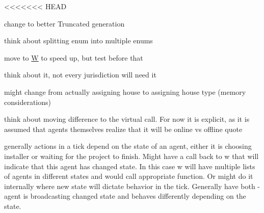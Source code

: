 
\begin{DoxyRefList}
<<<<<<< HEAD
\item[\label{_dev_stage2__DevStage2000027}%
\hypertarget{_dev_stage2__DevStage2000027}{}%
Member \hyperlink{namespaceserialize_aa5ee0bad0c960a3f06430066217d8c12}{serialize\+:\+:solve\+\_\+str\+\_\+formula} (const std\+::string \&formula\+\_\+, I\+Random \&rand\+\_\+)]change to better Truncated generation  
\item[\label{_dev_stage2__DevStage2000026}%
\hypertarget{_dev_stage2__DevStage2000026}{}%
Member \hyperlink{namespacesolar__core_aa1147341e5ef7a40d68d1bd68e149362}{solar\+\_\+core\+:\+:E\+Param\+Types} ]think about splitting enum into multiple enums 
\item[\label{_dev_stage2__DevStage2000001}%
\hypertarget{_dev_stage2__DevStage2000001}{}%
Member \hyperlink{classsolar__core_1_1_g_a624adac31ade604e0335717bad4fc9cd}{solar\+\_\+core\+:\+:G\+:\+:G} (const Property\+Tree \&pt\+\_\+, \hyperlink{classsolar__core_1_1_w}{W} $\ast$w\+\_\+)]move to \hyperlink{classsolar__core_1_1_w}{W} to speed up, but test before that  
\item[\label{_dev_stage2__DevStage2000002}%
\hypertarget{_dev_stage2__DevStage2000002}{}%
Member \hyperlink{classsolar__core_1_1_g_a33472d3b331a303ec8a9b61e2da163d3}{solar\+\_\+core\+:\+:G\+:\+:schedule\+\_\+visits} ]think about it, not every jurisdiction will need it  
\item[\label{_dev_stage2__DevStage2000008}%
\hypertarget{_dev_stage2__DevStage2000008}{}%
Class \hyperlink{classsolar__core_1_1_household}{solar\+\_\+core\+:\+:Household} ]might change from actually assigning house to assigning house type (memory considerations) 
\item[\label{_dev_stage2__DevStage2000005}%
\hypertarget{_dev_stage2__DevStage2000005}{}%
Member \hyperlink{classsolar__core_1_1_household_a165b7c64c72e5ed4ea08307e32082517}{solar\+\_\+core\+:\+:Household\+:\+:ac\+\_\+inf\+\_\+quoting\+\_\+sei} ()]think about moving difference to the virtual call. For now it is explicit, as it is assumed that agents themselves realize that it will be online vs offline quote  
\item[\label{_dev_stage2__DevStage2000007}%
\hypertarget{_dev_stage2__DevStage2000007}{}%
Member \hyperlink{classsolar__core_1_1_household_a1e7d20a60dc42b8d09a8d23a4cdb26a6}{solar\+\_\+core\+:\+:Household\+:\+:act\+\_\+tick} ()]generally actions in a tick depend on the state of an agent, either it is choosing installer or waiting for the project to finish. Might have a call back to w that will indicate that this agent has changed state. In this case w will have multiple lists of agents in different states and would call appropriate function. Or might do it internally where new state will dictate behavior in the tick. Generally have both -\/ agent is broadcasting changed state and behaves differently depending on the state.  

\end{DoxyRefList}
